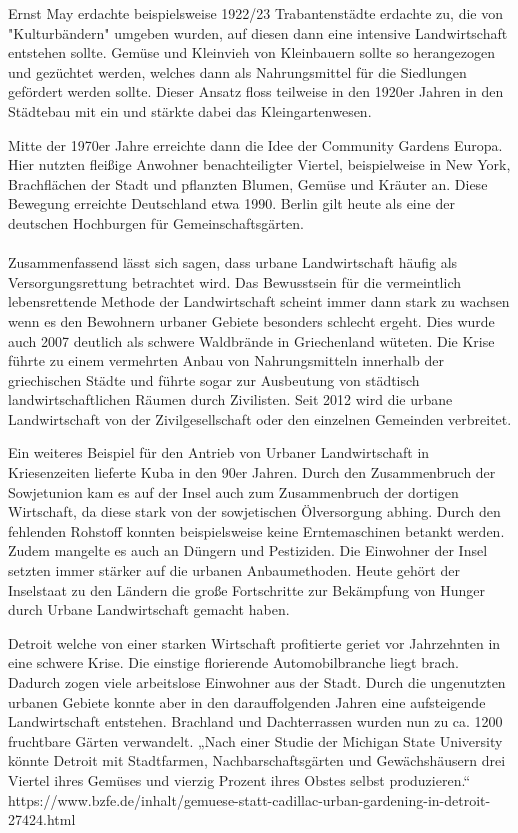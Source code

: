 \documentclass{scrartcl}
\begin{document}
Ernst May erdachte beispielsweise 1922/23 Trabantenstädte erdachte zu, die von "Kulturbändern" umgeben wurden, auf diesen dann eine intensive Landwirtschaft entstehen sollte. Gemüse und Kleinvieh von Kleinbauern sollte so herangezogen und gezüchtet werden, welches dann als Nahrungsmittel für die Siedlungen gefördert werden sollte. Dieser Ansatz floss teilweise in den 1920er Jahren in den Städtebau mit ein und stärkte dabei das Kleingartenwesen.

Mitte der 1970er Jahre erreichte dann die Idee der Community Gardens Europa. Hier nutzten fleißige Anwohner benachteiligter Viertel, beispielweise in New York, Brachflächen der Stadt und pflanzten Blumen, Gemüse und Kräuter an. Diese Bewegung erreichte Deutschland etwa 1990. Berlin gilt heute als eine der deutschen Hochburgen für Gemeinschaftsgärten.\\
\\
Zusammenfassend lässt sich sagen, dass urbane Landwirtschaft häufig als Versorgungsrettung betrachtet wird. Das Bewusstsein für die vermeintlich lebensrettende Methode der Landwirtschaft scheint immer dann stark zu wachsen wenn es den Bewohnern urbaner Gebiete besonders schlecht ergeht. Dies wurde auch 2007 deutlich als schwere Waldbrände in Griechenland wüteten. Die Krise führte zu einem vermehrten Anbau von Nahrungsmitteln innerhalb der griechischen Städte und führte sogar zur Ausbeutung von städtisch landwirtschaftlichen Räumen durch Zivilisten. Seit 2012 wird die urbane Landwirtschaft von der Zivilgesellschaft oder den einzelnen Gemeinden verbreitet.

Ein weiteres Beispiel für den Antrieb von Urbaner Landwirtschaft in Kriesenzeiten lieferte Kuba in den 90er Jahren. Durch den Zusammenbruch der Sowjetunion kam es auf der Insel auch zum Zusammenbruch der dortigen Wirtschaft, da diese stark von der sowjetischen Ölversorgung abhing. Durch den fehlenden Rohstoff konnten beispielsweise keine Erntemaschinen betankt werden. Zudem mangelte es auch an Düngern und Pestiziden. Die Einwohner der Insel setzten immer stärker auf die urbanen Anbaumethoden. Heute gehört der Inselstaat zu den Ländern die große Fortschritte zur Bekämpfung von Hunger durch Urbane Landwirtschaft gemacht haben.

Detroit welche von einer starken Wirtschaft profitierte geriet vor Jahrzehnten in eine schwere Krise. Die einstige florierende Automobilbranche liegt brach. Dadurch zogen viele arbeitslose Einwohner aus der Stadt. Durch die ungenutzten urbanen Gebiete konnte aber in den darauffolgenden Jahren eine aufsteigende Landwirtschaft entstehen. Brachland und Dachterrassen wurden nun zu ca. 1200 fruchtbare Gärten verwandelt. „Nach einer Studie der Michigan State University könnte Detroit mit Stadtfarmen, Nachbarschaftsgärten und Gewächshäusern drei Viertel ihres Gemüses und vierzig Prozent ihres Obstes selbst produzieren.“ https://www.bzfe.de/inhalt/gemuese-statt-cadillac-urban-gardening-in-detroit-27424.html
\end{document}
